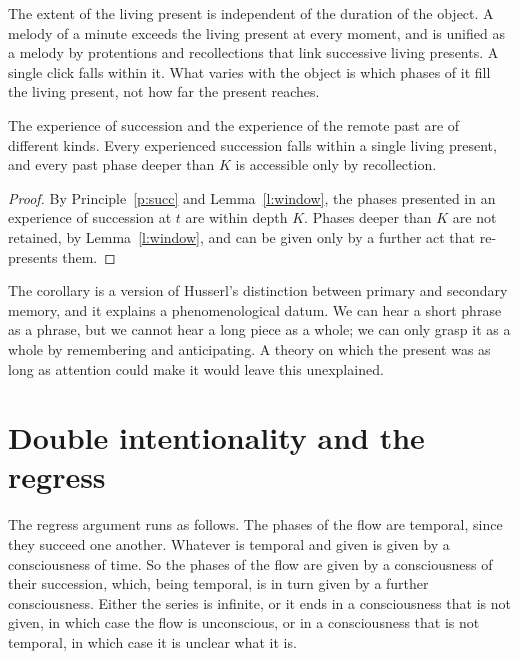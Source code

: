 \documentclass{situationist-preprint}
\begin{document}
\begin{remark}\label{r:object}
The extent of the living present is independent of the duration of the object. A melody of a minute exceeds the living present at every moment, and is unified as a melody by protentions and recollections that link successive living presents. A single click falls within it. What varies with the object is which phases of it fill the living present, not how far the present reaches.
\end{remark}

\begin{corollary}\label{c:sep}
The experience of succession and the experience of the remote past are of different kinds. Every experienced succession falls within a single living present, and every past phase deeper than $K$ is accessible only by recollection.
\end{corollary}

\begin{proof}
By Principle~\ref{p:succ} and Lemma~\ref{l:window}, the phases presented in an experience of succession at $t$ are within depth $K$. Phases deeper than $K$ are not retained, by Lemma~\ref{l:window}, and can be given only by a further act that re-presents them.
\end{proof}

The corollary is a version of Husserl's distinction between primary and secondary memory, and it explains a phenomenological datum. We can hear a short phrase as a phrase, but we cannot hear a long piece as a whole; we can only grasp it as a whole by remembering and anticipating. A theory on which the present was as long as attention could make it would leave this unexplained.

\section{Double intentionality and the regress}\label{s:regress}

The regress argument runs as follows. The phases of the flow are temporal, since they succeed one another. Whatever is temporal and given is given by a consciousness of time. So the phases of the flow are given by a consciousness of their succession, which, being temporal, is in turn given by a further consciousness. Either the series is infinite, or it ends in a consciousness that is not given, in which case the flow is unconscious, or in a consciousness that is not temporal, in which case it is unclear what it is.
\end{document}
